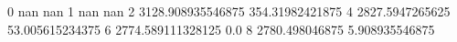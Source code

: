 0 nan nan
1 nan nan
2 3128.908935546875 354.31982421875
4 2827.5947265625 53.005615234375
6 2774.589111328125 0.0
8 2780.498046875 5.908935546875
